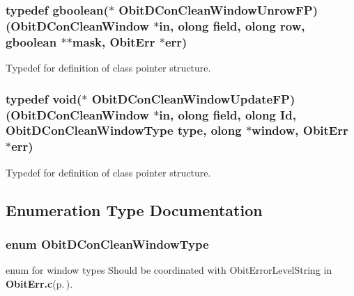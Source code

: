 \subsubsection{\setlength{\rightskip}{0pt plus 5cm}typedef gboolean($\ast$ {\bf Obit\-DCon\-Clean\-Window\-Unrow\-FP})({\bf Obit\-DCon\-Clean\-Window} $\ast$in, {\bf olong} field, {\bf olong} row, gboolean $\ast$$\ast$mask, {\bf Obit\-Err} $\ast$err)}\label{ObitDConCleanWindow_8h_a14}


Typedef for definition of class pointer structure. 

\subsubsection{\setlength{\rightskip}{0pt plus 5cm}typedef void($\ast$ {\bf Obit\-DCon\-Clean\-Window\-Update\-FP})({\bf Obit\-DCon\-Clean\-Window} $\ast$in, {\bf olong} field, {\bf olong} Id, {\bf Obit\-DCon\-Clean\-Window\-Type} type, {\bf olong} $\ast$window, {\bf Obit\-Err} $\ast$err)}\label{ObitDConCleanWindow_8h_a9}


Typedef for definition of class pointer structure. 



\subsection{Enumeration Type Documentation}
\subsubsection{\setlength{\rightskip}{0pt plus 5cm}enum {\bf Obit\-DCon\-Clean\-Window\-Type}}\label{ObitDConCleanWindow_8h_a48}


enum for window types Should be coordinated with Obit\-Error\-Level\-String in {\bf Obit\-Err.c}{\rm (p.\,\pageref{ObitErr_8c})}. 

